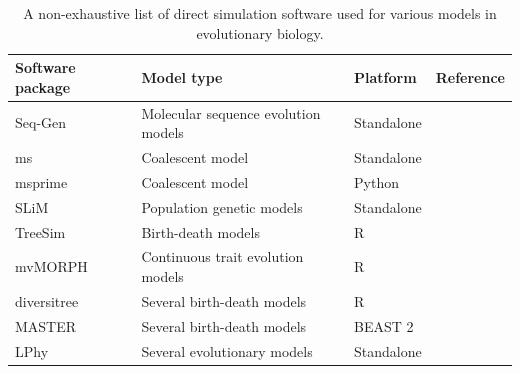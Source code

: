 \documentclass[oneside]{article}
\begin{document}
\begin{center}
  \begin{table}[h]
  \caption{A non-exhaustive list of direct simulation software used for various models in evolutionary biology.}
  \label{tab:sim}
  \centering
  \begin{tabular}{ p{0.7in} | p{1.5in} | p{1in} | p{1.3in} }
    \hline
    Software package & Model type & Platform & Reference \\
    \hline  
    Seq-Gen & Molecular sequence evolution models & Standalone & \citealp{rambaut97} \\
    ms & Coalescent model & Standalone & \citealp{hudson02}\\
    msprime & Coalescent model & Python & \citealp{kelleher16}\\
    SLiM & Population genetic models & Standalone & \citealp{haller19}\\    
    TreeSim & Birth-death models & R & \citealp{stadler11}\\
    mvMORPH & Continuous trait evolution models & R & \citealp{clavel15}\\
    diversitree & Several birth-death models & R & \citealp{revell12}\\
    MASTER & Several birth-death models & BEAST 2 & \citealp{vaughan13}\\
    LPhy & Several evolutionary models & Standalone & \citealp{drummond22}\\ 
    \hline
  \end{tabular}
  \end{table}
\end{center}



\end{document}
